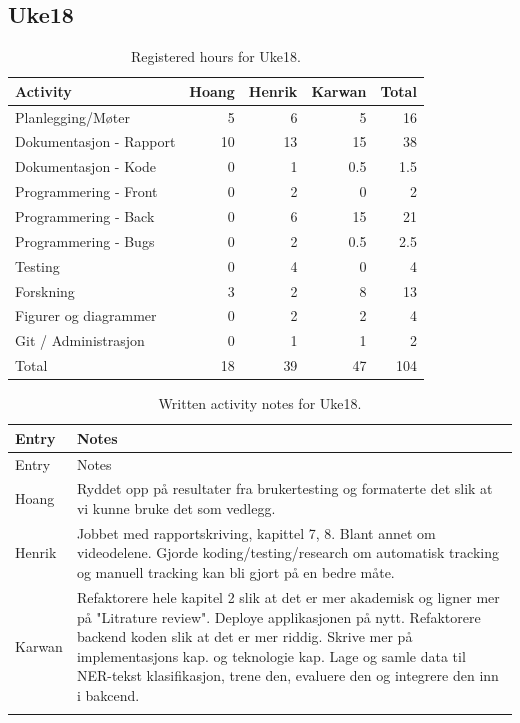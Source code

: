 \subsection{Uke18}

\begin{table}[H]
\centering
\small
\caption{Registered hours for Uke18.}
\label{tab:project-hours-uke18}
\begin{tabular}{lrrrr}
\toprule
Activity & Hoang & Henrik & Karwan & Total \\
\midrule
Planlegging/Møter & 5 & 6 & 5 & 16 \\
Dokumentasjon - Rapport & 10 & 13 & 15 & 38 \\
Dokumentasjon - Kode & 0 & 1 & 0.5 & 1.5 \\
Programmering - Front & 0 & 2 & 0 & 2 \\
Programmering - Back & 0 & 6 & 15 & 21 \\
Programmering - Bugs & 0 & 2 & 0.5 & 2.5 \\
Testing & 0 & 4 & 0 & 4 \\
Forskning & 3 & 2 & 8 & 13 \\
Figurer og diagrammer & 0 & 2 & 2 & 4 \\
Git / Administrasjon & 0 & 1 & 1 & 2 \\
\midrule
Total & 18 & 39 & 47 & 104 \\
\bottomrule
\end{tabular}
\end{table}

\begin{longtable}{p{}p{}}
\caption{Written activity notes for Uke18.}\\
\toprule
Entry & Notes \\
\midrule
\endfirsthead
\toprule
Entry & Notes \\
\midrule
\endhead
Hoang & Ryddet opp på resultater fra brukertesting og formaterte det slik at vi kunne bruke det som vedlegg. \\
\addlinespace
Henrik & Jobbet med rapportskriving, kapittel 7, 8. Blant annet om videodelene. Gjorde koding/testing/research om automatisk tracking og manuell tracking kan bli gjort på en bedre måte. \\
\addlinespace
Karwan & Refaktorere hele kapitel 2 slik at det er mer akademisk og ligner mer på "Litrature review". Deploye applikasjonen på nytt. Refaktorere backend koden slik at det er mer riddig. Skrive mer på implementasjons kap. og teknologie kap. Lage og samle data til NER-tekst klasifikasjon, trene den, evaluere den og integrere den inn i bakcend. \\
\addlinespace
\bottomrule
\end{longtable}

